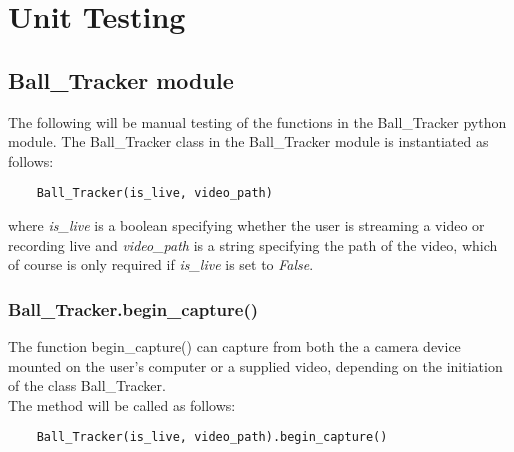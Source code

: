 


\chapter{Unit Testing}

\setlength{\parindent}{0cm}

\section{Ball\_Tracker module}
The following will be manual testing of the functions in the Ball\_Tracker python module. The Ball\_Tracker class in the Ball\_Tracker module is instantiated as follows:
\begin{verbatim}
    Ball_Tracker(is_live, video_path)
\end{verbatim}

where \textit{is\_live} is a boolean specifying whether the user is streaming a video or recording live and \textit{video\_path} is a string specifying the path of the video, which of course is only required if \textit{is\_live} is set to \textit{False}.

\subsection{Ball\_Tracker.begin\_capture()} \label{test_capture}
The function begin\_capture() can capture from both the a camera device mounted on the user's computer or a supplied video, depending on the initiation of the class Ball\_Tracker.\\
The method will be called as follows:
\begin{verbatim}
    Ball_Tracker(is_live, video_path).begin_capture()
\end{verbatim}

